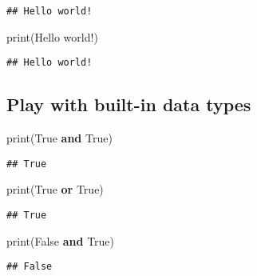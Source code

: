 \documentclass[
]{book}
\newenvironment{Shaded}{\begin{snugshade}}{\end{snugshade}}
\newcommand{\BuiltInTok}[1]{#1}
\newcommand{\KeywordTok}[1]{\textcolor[rgb]{0.13,0.29,0.53}{\textbf{#1}}}
\newcommand{\NormalTok}[1]{#1}
\newcommand{\StringTok}[1]{\textcolor[rgb]{0.31,0.60,0.02}{#1}}
\newcommand{\VariableTok}[1]{\textcolor[rgb]{0.00,0.00,0.00}{#1}}
\begin{document}
\begin{verbatim}
## Hello world!
\end{verbatim}

\begin{Shaded}
\begin{Highlighting}[]
\BuiltInTok{print}\NormalTok{(}\StringTok{\textquotesingle{}Hello world!\textquotesingle{}}\NormalTok{)}
\end{Highlighting}
\end{Shaded}

\begin{verbatim}
## Hello world!
\end{verbatim}

\hypertarget{play-with-built-in-data-types}{%
\subsection{Play with built-in data types}\label{play-with-built-in-data-types}}

\begin{Shaded}
\begin{Highlighting}[]
\BuiltInTok{print}\NormalTok{(}\VariableTok{True} \KeywordTok{and} \VariableTok{True}\NormalTok{)}
\end{Highlighting}
\end{Shaded}

\begin{verbatim}
## True
\end{verbatim}

\begin{Shaded}
\begin{Highlighting}[]
\BuiltInTok{print}\NormalTok{(}\VariableTok{True} \KeywordTok{or} \VariableTok{True}\NormalTok{)}
\end{Highlighting}
\end{Shaded}

\begin{verbatim}
## True
\end{verbatim}

\begin{Shaded}
\begin{Highlighting}[]
\BuiltInTok{print}\NormalTok{(}\VariableTok{False} \KeywordTok{and} \VariableTok{True}\NormalTok{)}
\end{Highlighting}
\end{Shaded}

\begin{verbatim}
## False
\end{verbatim}
\end{document}

